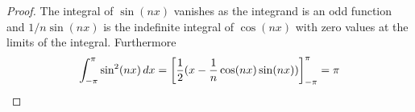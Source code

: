 \begin{proof}
	The integral of \( \sin(nx) \) vanishes as the integrand is an odd function and \( 1/n \sin(nx) \)
	is the indefinite integral of \( \cos(nx) \) with zero values at the limits of the integral.
	Furthermore
	\[
		\int_{-\pi}^\pi \sin^2(nx)\,dx = {\left[\frac{1}{2}(x - \frac{1}{n}\cos(nx)\sin(nx))\right]}_{-\pi}^\pi = \pi
	\]

\end{proof}